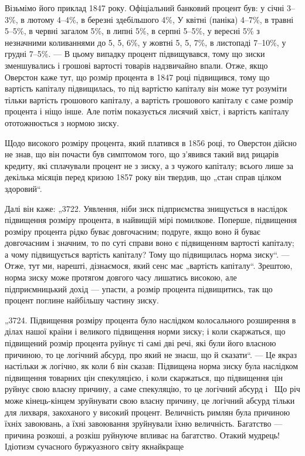 Візьмімо його приклад 1847 року. Офіціальний банковий процент був: у січні 3--3\%,
в лютому 4--4\%, в березні здебільшого 4\%, У квітні (паніка) 4--7\%, в травні 5--5\%, в червні загалом 5\%,
в липні 5\%, в серпні 5--5\%, у вересні 5\% з незначними
коливаннями до 5, 5, 6\%, у жовтні 5, 5, 7\%, в листопаді 7--10\%, у грудні 7--5\%. — В цьому
випадку процент підвищувався,
тому що зиски зменшувались і грошові вартості товарів надзвичайно впали. Отже, якщо Оверстон каже
тут, що розмір процента
в 1847 році підвищився, тому що вартість капіталу підвищилась,
то під вартістю капіталу він може тут розуміти тільки вартість
грошового капіталу, а вартість грошового капіталу є саме розмір
процента і ніщо інше. Але потім показується лисячий хвіст,
і вартість капіталу ототожнюється з нормою зиску.

Щодо високого розміру процента, який платився в 1856 році,
то Оверстон дійсно не знав, що він почасти був симптомом того,
що з’явився такий вид рицарів кредиту, які сплачували процент
не з зиску, а з чужого капіталу; всього лише за декілька місяців
перед кризою 1857 року він твердив, що „стан справ цілком
здоровий“.

Далі він каже: „3722. Уявлення, ніби зиск підприємства знищується в наслідок підвищення розміру
процента, в найвищій
мірі помилкове. Поперше, підвищення розміру процента рідко
буває довгочасним; подруге, якщо воно й буває довгочасним
і значним, то по суті справи воно є підвищенням вартості капіталу; а чому підвищується вартість
капіталу? Тому що підвищилась норма зиску“. — Отже, тут ми, нарешті, дізнаємося,
який сенс має „вартість капіталу“. Зрештою, норма зиску може
протягом довгого часу лишатись високою, але підприємницький
дохід — упасти, а розмір процента підвищитись, так що процент поглине найбільшу частину зиску.

„3724. Підвищення розміру процента було наслідком колосального
розширення в ділах нашої країни і великого підвищення норми зиску; і коли скаржаться, що підвищений
розмір
процента руйнує ті самі дві речі, які були його власною причиною, то це логічний абсурд, про який не
знаєш, що й сказати“. — Це якраз настільки ж логічно, як коли б він сказав:
Підвищена норма зиску була наслідком підвищення товарних
цін спекуляцією, і коли скаржаться, що підвищення цін руйнує
свою власну причину, а саме спекуляцію, то це логічний абсурд
і~ Що річ може кінець-кінцем зруйнувати свою власну причину, це логічний абсурд тільки для
лихваря, закоханого у високий процент. Величність римлян була причиною їхніх завоювань,
а їхні завоювання зруйнували їхню величність. Багатство — причина
розкоші, а розкіш руйнуюче впливає на багатство. Отакий
мудрець! Ідіотизм сучасного буржуазного світу якнайкраще
\parbreak{}  %
